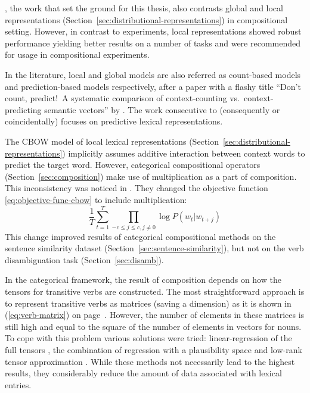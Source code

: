 \citet{milajevs-EtAl:2014:EMNLP2014}, the work that set the ground for this thesis, also contrasts global and local representations (Section~\ref{sec:distributional-representations}) in compositional setting. However, in contrast to \citet{blacoe2012comparison} experiments, local representations showed robust performance yielding better results on a number of tasks and were recommended for usage in compositional experiments.

In the literature, local and global models are also referred as count-based models and prediction-based models respectively, after a paper with a flashy title ``Don’t count, predict!~A systematic comparison of context-counting vs.~context-predicting semantic vectors'' by \citet{baroni-dinu-kruszewski:2014:P14-1}. The work consecutive to \citet{milajevs-EtAl:2014:EMNLP2014} (consequently or coincidentally) focuses on predictive lexical representations.

The CBOW model of local lexical representations (Section~\ref{sec:distributional-representations}) implicitly assumes additive interaction between context words to predict the target word. However, categorical compositional operators (Section~\ref{sec:composition}) make use of multiplication as a part of composition. This inconsistency was noticed in \citet{kim2015neural}. They changed the objective function \eqref{eq:objective-func-cbow} to include multiplication:
%
\begin{equation}
 \frac{1}{T}\sum^{T}_{t=1}\prod_{-c \leq j \leq c, j\neq0} \log P(w_{t}|w_{t+j})
  \label{eq:objective-func-cbow-mult}
\end{equation}
%
This change improved results of categorical compositional methods on the sentence similarity dataset (Section~\ref{sec:sentence-similarity}), but not on the verb disambiguation task (Section~\ref{sec:disamb}).

In the categorical framework, the result of composition depends on how the tensors for transitive verbs are constructed. The most straightforward approach is to represent transitive verbs as matrices (saving a dimension) as it is shown in (\ref{eq:verb-matrix}) on page~\pageref{eq:verb-matrix}. However, the number of elements in these matrices is still high and equal to the square of the number of elements in vectors for nouns. To cope with this problem various solutions were tried: linear-regression of the full tensors \cite{grefenstette-et-al:2013:IWCS2013}, the combination of regression with a plausibility space \cite{polajnar-clark:2014:EACL} and low-rank tensor approximation \cite{fried-polajnar-clark:2015:ACL-IJCNLP}. While these methods not necessarily lead to the highest results, they considerably reduce the amount of data associated with lexical entries.

